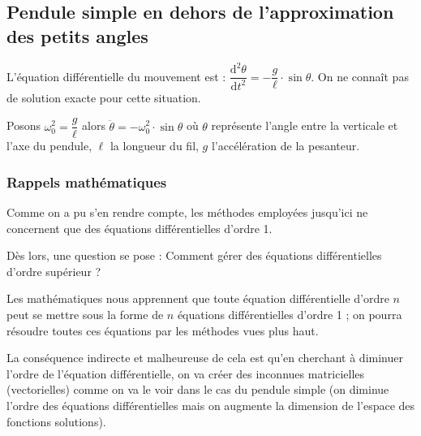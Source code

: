 \documentclass[11pt]{article}
\begin{document}
 
 
 
 
 
    
 
 
 
 
 
 
 
 \subsection{Pendule simple en dehors de l'approximation des petits angles}
 
 L'équation différentielle du mouvement est : $\dfrac{\text{d}^2\theta}{\text{d}t^2} = -\dfrac{g}{\ell}\cdot \sin \theta$. On ne connaît pas de solution exacte pour cette situation.


Posons $\omega_0^2 = \dfrac{g}{\ell}$ alors $\ddot{\theta} = -\omega_0^2\cdot \sin \theta$ où $\theta$ représente l'angle entre la verticale et l'axe du pendule, $\ell$ la longueur du fil, $g$ l'accélération de la pesanteur.

 
 \subsubsection{Rappels mathématiques}
 
 Comme on a pu s'en rendre compte, les méthodes employées jusqu'ici ne concernent que des équations différentielles d'ordre 1.
 
 \smallskip
 
 Dès lors, une question se pose : Comment gérer des équations différentielles d'ordre supérieur ?
 
 \smallskip
 
 Les mathématiques nous apprennent que toute équation différentielle d'ordre $n$ peut se mettre sous la forme de $n$ équations différentielles d'ordre 1 ; on pourra résoudre toutes ces équations par les méthodes vues plus haut.
 
 \smallskip
 
 La conséquence indirecte et malheureuse de cela est qu'en cherchant à diminuer l'ordre de l'équation différentielle, on va créer des inconnues matricielles (vectorielles) comme on va le voir dans le cas du pendule simple (on diminue l'ordre des équations différentielles mais on augmente la dimension de l'espace des fonctions solutions).
 
\end{document}
